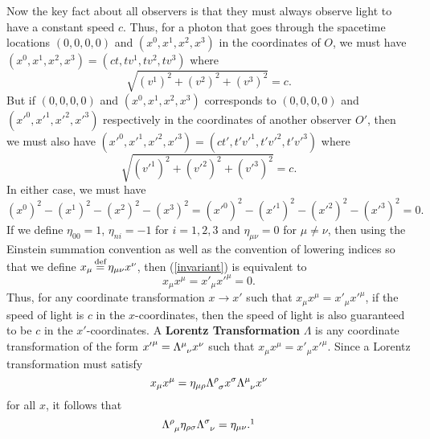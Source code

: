 Now the key fact about all observers is that they must always observe light to have a constant speed $c$. Thus,  for a photon that goes through the spacetime locations $(0,0,0,0)$ and $(x^0, x^1, x^2, x^3)$ in the coordinates of $O$, we must have $(x^0, x^1, x^2, x^3)=(ct,tv^1,tv^2,tv^3)$ where 
$$\sqrt{(v^1)^2 +(v^2)^2+(v^3)^2}=c.$$ But if $(0,0,0,0)$ and $(x^0, x^1, x^2, x^3)$ corresponds to $(0,0,0,0)$ and $({x'}^0, {x'}^1, {x'}^2, {x'}^3)$ respectively in the coordinates of another observer $O'$, then we must also have $({x'}^0, {x'}^1, {x'}^2, {x'}^3)=(ct',t'{v'}^1,t'{v'}^2,t'{v'}^3)$ where 
$$\sqrt{({v'}^1)^2 +({v'}^2)^2+({v'}^3)^2}=c.$$ 
In either case, we must have 
\begin{equation}\label{invariant}
(x^0)^2- (x^1)^2- (x^2)^2 - (x^3)^2=({x'}^0)^2- ({x'}^1)^2- ({x'}^2)^2 - ({x'}^3)^2=0.
\end{equation}
If we define $\eta_{00}=1$, $\eta_{ni}=-1$ for $i=1,2,3$ and $\eta_{\mu\nu}=0$ for $\mu\neq\nu$, then using the Einstein summation convention as well as the convention of lowering indices so that we define $x_\mu\myeq\eta_{\mu\nu}x^\nu$, then (\ref{invariant}) is equivalent to 
$$x_\mu x^\mu={x'}_\mu {x'}^\mu=0.$$ 
Thus, for any coordinate transformation $x\rightarrow x'$ such that  $x_\mu x^\mu={x'}_\mu{x'}^\mu$,  if the speed of light is $c$ in the $x$-coordinates, then the speed of light is also guaranteed to be $c$ in the $x'$-coordinates.  A \textbf{Lorentz Transformation} $\Lambda$ is any coordinate transformation of the form ${x'}^\mu=\Lambda\indices{^\mu_\nu}x^\nu$ such that $x_\mu x^\mu={x'}_\mu{x'}^\mu$. Since a Lorentz transformation must satisfy
$$x_\mu x^\mu=\eta_{\mu\rho}\Lambda\indices{^\rho_\sigma}x^\sigma\Lambda\indices{^\mu_\nu}x^\nu$$
for all $x$, it follows that  
\begin{equation}\label{lorentztrans}
\Lambda\indices{^\rho_\mu}\eta_{\rho\sigma}\Lambda\indices{^\sigma_\nu}=\eta_{\mu\nu}.\protect\footnotemark
\end{equation}
